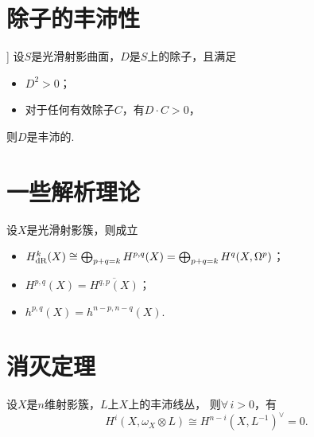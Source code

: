 \newcommand{\dR}{\rm{dR}}

\section{除子的丰沛性}
\begin{theorem}[中井-Moishezon判别法，[Har77.V.1.10]]
    设$S$是光滑射影曲面，$D$是$S$上的除子，且满足
    \begin{itemize}
        \item[(1)] $D^{2} > 0$；
        \item[(2)] 对于任何有效除子$C$，有$D \cdot C > 0$，
    \end{itemize}
    则$D$是丰沛的.
\end{theorem}

\section{一些解析理论}
\begin{theorem}[Hodge]
    设$X$是光滑射影簇，则成立
    \begin{itemize}
        \item[(1)] $H_{\dR}^{k}(X) \cong 
                    \bigoplus_{p+q=k}H^{p,q}(X) = 
                    \bigoplus_{p+q=k}H^{q}(X,\Omega^{p})$；
        \item[(2)] $H^{p,q}(X) = \overline{H^{q,p}(X)}$；
        \item[(3)] $h^{p,q}(X) = h^{n-p,n-q}(X)$.
    \end{itemize}
\end{theorem}

\section{消灭定理}
\begin{theorem}[Kodaira消灭定理]
    设$X$是$n$维射影簇，$L$上$X$上的丰沛线丛，
    则$\forall \, i > 0$，有
    \[H^{i}(X,\omega_{X} \otimes L) 
    \cong H^{n-i}(X,L^{-1})^{\vee} = 0.\]
\end{theorem}

